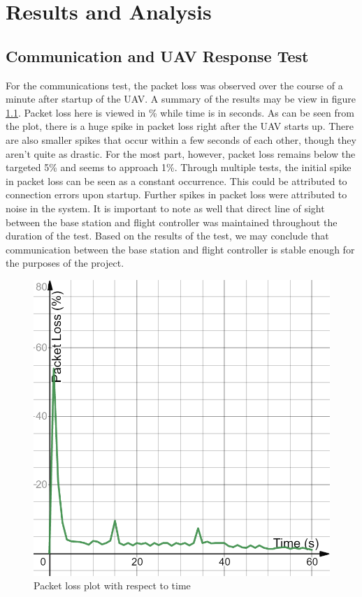 \documentclass[english]{upeeei}
\begin{document}
\chapter{Results and Analysis}
\section{Communication and UAV Response Test}
For the communications test, the packet loss was observed over the course of a minute after startup of the UAV. A summary of the results may
be view in figure \ref{fig:comms_plot}. Packet loss here is viewed in \% while time is in seconds. As can be seen from the plot, there is a huge
spike in packet loss right after the UAV starts up. There are also smaller spikes that occur within a few seconds of each other, though they aren't
quite as drastic. For the most part, however, packet loss remains below the targeted 5\% and seems to approach 1\%. Through multiple tests, 
the initial spike in packet loss can be seen as a constant occurrence. This could be attributed to connection errors upon startup. Further 
spikes in packet loss were attributed to noise in the system. It is important to note as well that direct line of sight between the base station 
and flight controller was maintained throughout the duration of the test. Based on the results of the test, we may conclude that communication
between the base station and flight controller is stable enough for the purposes of the project.
\begin{figure}[h]
    \centering
    \includegraphics[scale=0.3]{images/comms_plot.png}
    \caption{Packet loss plot with respect to time}
    \label{fig:comms_plot}
\end{figure}
\end{document}
